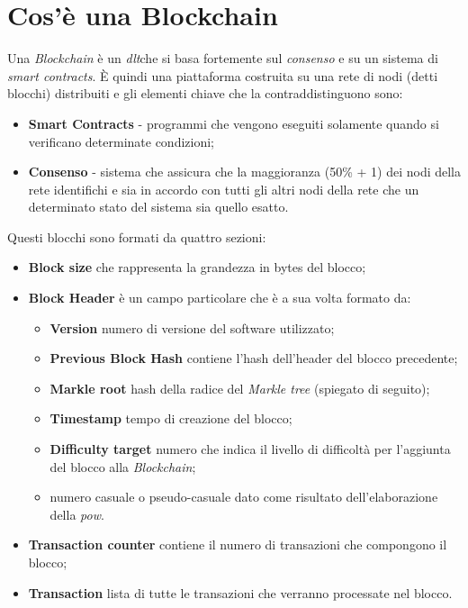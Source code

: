 \section{Cos'è una Blockchain}
Una \textit{Blockchain} è un \emph{\gls{dlt}}\glsfirstoccur che si basa fortemente sul \textit{consenso} e su un sistema di \textit{smart contracts}\cite{linuxFoundation}.
È quindi una piattaforma costruita su una rete di nodi (detti blocchi) distribuiti e gli elementi chiave che la contraddistinguono sono:
\begin{itemize}
	\item \textbf{Smart Contracts} - programmi che vengono eseguiti solamente quando si verificano determinate condizioni;
	\item \textbf{Consenso} - sistema che assicura che la maggioranza (50\% + 1) dei nodi della rete identifichi e sia in accordo con tutti gli altri nodi della rete che un determinato stato del sistema sia quello esatto.
\end{itemize}
Questi blocchi sono formati da quattro sezioni:
\begin{itemize}
	\item \textbf{Block size} che rappresenta la grandezza in bytes del blocco;
	\item \textbf{Block Header} è un campo particolare che è a sua volta formato da:
	\begin{itemize}
		\item \textbf{Version} numero di versione del software utilizzato;
		\item \textbf{Previous Block Hash} contiene l'hash dell'header del blocco precedente;
		\item \textbf{Markle root} hash della radice del \textit{Markle tree} (spiegato di seguito);
		\item \textbf{Timestamp} tempo di creazione del blocco;
		\item \textbf{Difficulty target} numero che indica il livello di difficoltà per l'aggiunta del blocco alla \textit{Blockchain};
		\item numero casuale o pseudo-casuale dato come risultato dell'elaborazione della \emph{\gls{pow}}\glsfirstoccur.
	\end{itemize}
	\item \textbf{Transaction counter} contiene il numero di transazioni che compongono il blocco;
	\item \textbf{Transaction} lista di tutte le transazioni che verranno processate nel blocco.
\end{itemize}
